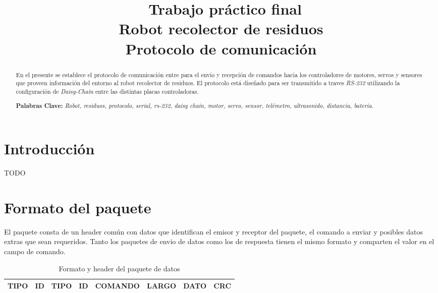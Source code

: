 \documentclass[a4paper,11pt]{article}
\begin{document}
\title{{\ Trabajo pr\'actico final \\ Robot recolector de residuos \\ Protocolo de comunicaci\'on}}



\maketitle
\begin{abstract}
En el presente se establece el protocolo de comunicaci\'on entre para el envio y recepci\'on de comandos hacia los controladores
de motores, servos y sensores que proveen informaci\'on del entorno al robot recolector de residuos. El protocolo est\'a dise\~nado
para ser transmitido a traves \emph{RS-232} utilizando la configuraci\'on de \emph{Daisy-Chain} entre las distintas placas controladoras.

\textbf{Palabras Clave: }\emph{Robot, residuos, protocolo, serial, rs-232, daisy chain, motor, servo, sensor, tel\'emetro, ultrasonido, distancia, bateria}.
\end{abstract}



\section{Introducci\'on}
\label{introduccion}

TODO

\section{Formato del paquete}
\label{formato_paquete}


El paquete consta de un header com\'un con datos que identifican el emisor y receptor del paquete, el comando a enviar y posibles datos extras que sean requeridos.
Tanto los paquetes de envio de datos como los de respuesta tienen el mismo formato y comparten el valor en el campo de comando.

\begin{table}
\begin{center}
\begin{tabular}{|c|c|c|c|c|c|c|c|}
\hline
TIPO & ID & TIPO & ID & COMANDO & LARGO & DATO & CRC \\
\hline
\end{tabular}
\caption{Formato y header del paquete de datos}
\label{formato_paquete_tabla}
\end{center}
\end{table}
\end{document}
